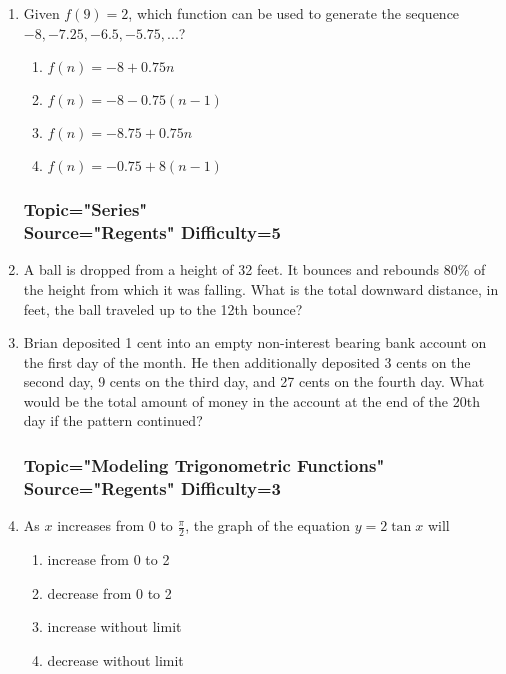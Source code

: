 \documentclass[12pt, oneside]{article}
\begin{document}
\begin{enumerate}
\item Given $f(9)=2$, which function can be used to generate the sequence  $-8, -7.25, -6.5, -5.75,...$?
\begin{enumerate}
    \item $f(n)=-8+0.75n$
    \item $f(n)=-8-0.75(n-1)$
    \item $f(n)=-8.75+0.75n$
    \item $f(n)=-0.75+8(n-1)$
\end{enumerate} %

\subsubsection*{Topic="Series"\\
Source="Regents" 
Difficulty=5}

\item A ball is dropped from a height of 32 feet. It bounces and rebounds 80\% of the height from which it was falling. What is the total downward distance, in feet, the ball traveled up to the 12th bounce? %

\item Brian deposited 1 cent into an empty non-interest bearing bank account on the first day of the month. He then additionally deposited 3 cents on the second day, 9 cents on the third day, and 27 cents on the fourth day. What would be the total amount of money in the account at the end of the 20th day if the pattern continued? %


\subsubsection*{Topic="Modeling Trigonometric Functions"\\
Source="Regents" 
Difficulty=3}

\item As $x$ increases from 0 to $\frac{\pi}{2}$, the graph of the equation $y=2 \tan x$ will
\begin{enumerate}
    \item increase from 0 to 2
    \item decrease from 0 to 2
    \item increase without limit
    \item decrease without limit
\end{enumerate} %


\end{enumerate}
\end{document}
